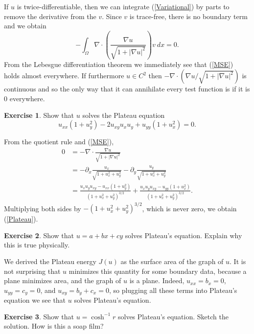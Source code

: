 \documentclass[10pt]{article}
\theoremstyle{definition}
\newtheorem{exer}{Exercise}
\begin{document}
If $u$ is twice-differentiable, then we can integrate (\ref{Variational}) by parts to remove the derivative from the $v$.
Since $v$ is trace-free, there is no boundary term and we obtain 
$$-\int_\Omega \nabla \cdot \left(\frac{\nabla u}{\sqrt{1 + |\nabla u|^2}}\right) v ~dx = 0.$$
From the Lebesgue differentiation theorem we immediately see that (\ref{MSE}) holds almost everywhere.
If furthermore $u \in C^2$ then $-\nabla \cdot(\nabla u/\sqrt{1 + |\nabla u|^2})$ is continuous and so the only way that it can annihilate every test function is if it is $0$ everywhere. 

\begin{exer}
    Show that $u$ solves the Plateau equation 
\begin{equation}\label{Plateau}
    u_{xx}(1 + u_y^2) - 2u_{xy} u_x u_y + u_{yy}(1 + u_x^2) = 0.
\end{equation}
\end{exer}

From the quotient rule and (\ref{MSE}),
\begin{align*}
0 &= -\nabla \cdot \frac{\nabla u}{\sqrt{1 + |\nabla u|^2}} \\
&= -\partial_x \frac{u_x}{\sqrt{1 + u_x^2 + u_y^2}} - \partial_y \frac{u_y}{\sqrt{1 + u_x^2 + u_y^2}} \\
&= \frac{u_x u_y u_{xy} - u_{xx} (1 + u_y^2)}{(1 + u_x^2 + u_y^2)^{3/2}} + \frac{u_x u_y u_{xy} - u_{yy}(1 + u_x^2)}{(1 + u_x^2 + u_y^2)^{3/2}}.
\end{align*}
Multiplying both sides by $-(1 + u_x^2 + u_y^2)^{3/2}$, which is never zero, we obtain (\ref{Plateau}).

\begin{exer}
    Show that $u = a + bx + cy$ solves Plateau's equation. Explain why this is true physically.
\end{exer}

We derived the Plateau energy $J(u)$ as the surface area of the graph of $u$.
It is not surprising that $u$ minimizes this quantity for some boundary data, because a plane minimizes area, and the graph of $u$ is a plane.
Indeed, $u_{xx} = b_x = 0$, $u_{yy} = c_y = 0$, and $u_{xy} = b_y + c_x = 0$, so plugging all these terms into Plateau's equation we see that $u$ solves Plateau's equation.

\begin{exer}
    Show that $u = \cosh^{-1} r$ solves Plateau's equation. Sketch the solution. How is this a soap film?
\end{exer}
\end{document}

